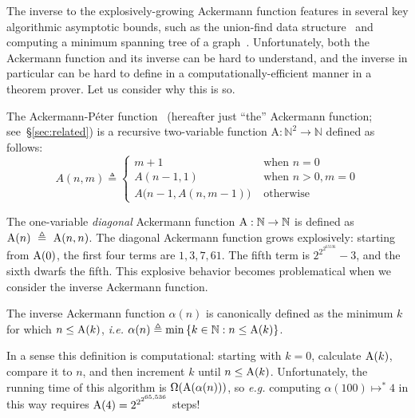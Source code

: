 The inverse to the
explosively-growing Ackermann function features in several key algorithmic asymptotic
bounds, such as the union-find data structure~\cite{tarjan} and computing a minimum spanning
tree of a graph~\cite{chazelle}.  Unfortunately, both the Ackermann function and its inverse
can be hard to understand, and the inverse in particular can be hard to define in a computationally-efficient manner in a theorem prover.  Let us consider why this
is so.
\begin{defn} \label{defn: ack} %
The Ackermann-P\'eter function~\cite{peter} (hereafter just ``the'' Ackermann function; see~\S\ref{sec:related}) is a recursive two-variable function $\text{A} : \mathbb{N}^2 \to \mathbb{N}$ defined as follows:
\begin{equation}
\label{eq:ackermann}
A(n, m) \triangleq \begin{cases}
m + 1 & \text{ when } n = 0 \\
A(n-1, 1) & \text{ when } n > 0, m = 0 \\
A\big(n-1, A(n, m-1)\big) & \text{ otherwise}
\end{cases}
\end{equation}
\end{defn}

The one-variable \emph{diagonal} Ackermann function $\text{A} : \mathbb{N} \to \mathbb{N}$ is defined as $\text{A}(n)~\triangleq~\text{A}(n, n)$.	
The diagonal Ackermann function grows explosively: starting from $\text{A}(0)$, the first four terms are $1, 3, 7, 61$.  The fifth term is $2^{2^{2^{65536}}}-3$, and the sixth dwarfs the fifth.
This explosive behavior becomes problematical when we consider
the inverse Ackermann function\cite{chazelle, tarjan}.
\begin{defn} \label{defn: inv_ack}
The inverse Ackermann function $\alpha(n)$ is canonically defined as the minimum $k$ for which $n \le \text{A}(k)$, \emph{i.e.} $\alpha(n) \triangleq \min\left\{k\in \mathbb{N} : n \le \text{A}(k)\right\}$.
\end{defn}
In a sense this definition is computational: starting with $k=0$, calculate $\text{A}(k)$, compare
it to $n$, and then increment $k$ until $n \le \text{A}(k)$.
Unfortunately, the running time of this algorithm is $\Omega(\text{A}(\alpha(n)))$,
so \emph{e.g.} computing $\alpha(100) \mapsto^{*} 4$ in this way requires
$\text{A}(4) = 2^{2^{2^{65,536}}}$ steps!

